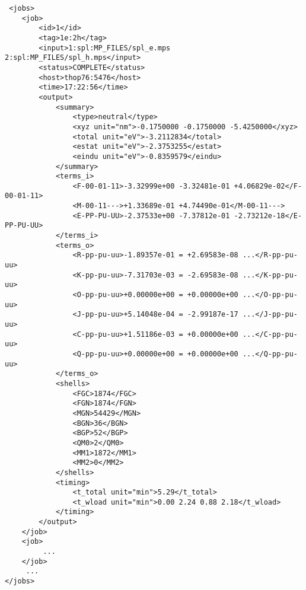 \begin{verbatim}
 <jobs>
    <job>
        <id>1</id>
        <tag>1e:2h</tag>
        <input>1:spl:MP_FILES/spl_e.mps 2:spl:MP_FILES/spl_h.mps</input>
        <status>COMPLETE</status>
        <host>thop76:5476</host>
        <time>17:22:56</time>
        <output>
            <summary>
                <type>neutral</type>
                <xyz unit="nm">-0.1750000 -0.1750000 -5.4250000</xyz>
                <total unit="eV">-3.2112834</total>
                <estat unit="eV">-2.3753255</estat>
                <eindu unit="eV">-0.8359579</eindu>
            </summary>
            <terms_i>
                <F-00-01-11>-3.32999e+00 -3.32481e-01 +4.06829e-02</F-00-01-11>
                <M-00-11--->+1.33689e-01 +4.74490e-01</M-00-11--->
                <E-PP-PU-UU>-2.37533e+00 -7.37812e-01 -2.73212e-18</E-PP-PU-UU>
            </terms_i>
            <terms_o>
                <R-pp-pu-uu>-1.89357e-01 = +2.69583e-08 ...</R-pp-pu-uu>
                <K-pp-pu-uu>-7.31703e-03 = -2.69583e-08 ...</K-pp-pu-uu>
                <O-pp-pu-uu>+0.00000e+00 = +0.00000e+00 ...</O-pp-pu-uu>
                <J-pp-pu-uu>+5.14048e-04 = -2.99187e-17 ...</J-pp-pu-uu>
                <C-pp-pu-uu>+1.51186e-03 = +0.00000e+00 ...</C-pp-pu-uu>
                <Q-pp-pu-uu>+0.00000e+00 = +0.00000e+00 ...</Q-pp-pu-uu>
            </terms_o>
            <shells>
                <FGC>1874</FGC>
                <FGN>1874</FGN>
                <MGN>54429</MGN>
                <BGN>36</BGN>
                <BGP>52</BGP>
                <QM0>2</QM0>
                <MM1>1872</MM1>
                <MM2>0</MM2>
            </shells>
            <timing>
                <t_total unit="min">5.29</t_total>
                <t_wload unit="min">0.00 2.24 0.88 2.18</t_wload>
            </timing>
        </output>
    </job>
    <job>
	     ...
    </job>
	 ...
</jobs>
    
\end{verbatim}

